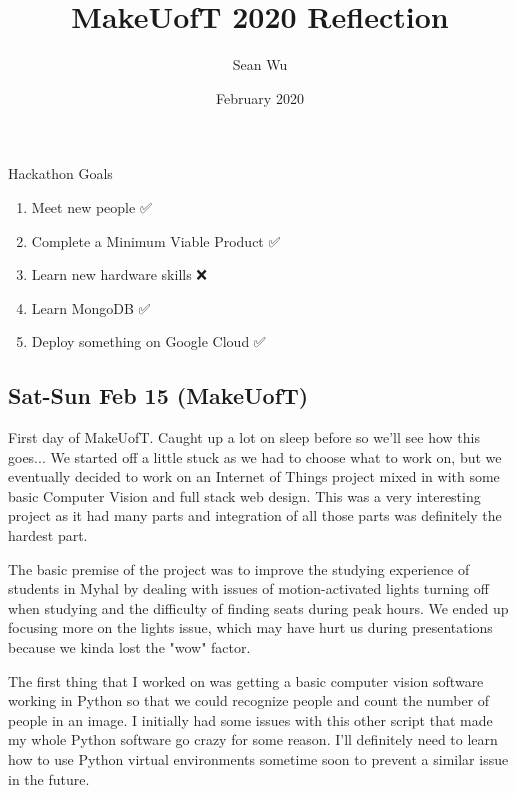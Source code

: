 \documentclass[a4paper,12pt]{gress}
\title{MakeUofT 2020 Reflection}
\author{Sean Wu}
\date{February 2020}
\begin{document}
\begin{titlepage}

\maketitle

\begin{goals}{Hackathon Goals}
\begin{enumerate}
  \item Meet new people ✅
  \item Complete a Minimum Viable Product ✅
  \item Learn new hardware skills ❌
  \item Learn MongoDB ✅
  \item Deploy something on Google Cloud ✅
\end{enumerate}
\end{goals}

\newpage

\tableofcontents

\end{titlepage}


\subsection{Sat-Sun Feb 15 (MakeUofT)}
First day of MakeUofT. Caught up a lot on sleep before so we'll see how this goes... We started off a little stuck as we had to choose what to work on, but we eventually decided to work on an Internet of Things project mixed in with some basic Computer Vision and full stack web design. This was a very interesting project as it had many parts and integration of all those parts was definitely the hardest part.

The basic premise of the project was to improve the studying experience of students in Myhal by dealing with issues of motion-activated lights turning off when studying and the difficulty of finding seats during peak hours. We ended up focusing more on the lights issue, which may have hurt us during presentations because we kinda lost the "wow" factor.

The first thing that I worked on was getting a basic computer vision software working in Python so that we could recognize people and count the number of people in an image. I initially had some issues with this other script that made my whole Python software go crazy for some reason. I'll definitely need to learn how to use Python virtual environments sometime soon to prevent a similar issue in the future.
\end{document}
